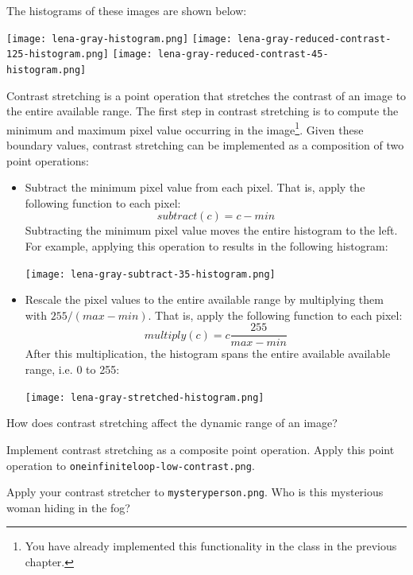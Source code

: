 \documentclass{book}
\begin{document}
The histograms of these images are shown below:
\begin{center}
\texttt{[image: lena-gray-histogram.png]}
\texttt{[image: lena-gray-reduced-contrast-125-histogram.png]}
\texttt{[image: lena-gray-reduced-contrast-45-histogram.png]}
\end{center}

Contrast stretching is a point operation that stretches the contrast of an image to the entire available range. The first step in contrast stretching is to compute the minimum and maximum pixel value occurring in the image\footnote{You have already implemented this functionality in the class  in the previous chapter.}. Given these boundary values, contrast stretching can be implemented as a composition of two point operations:
\begin{itemize}
  \item Subtract the minimum pixel value from each pixel. That is, apply the following function to each pixel:
$$subtract(c) = c - {min}$$
Subtracting the minimum pixel value moves the entire histogram to the left. For example, applying this operation to  results in the following histogram:
\begin{center}
\texttt{[image: lena-gray-subtract-35-histogram.png]}
\end{center}
  \item Rescale the pixel values to the entire available range by multiplying them with $255 / (max - min)$. That is, apply the following function to each pixel:
$$multiply(c) = c \frac{255}{max - min}$$
After this multiplication, the histogram spans the entire available available range, i.e. 0 to 255:
\begin{center}
\texttt{[image: lena-gray-stretched-histogram.png]}
\end{center}
\end{itemize}

\begin{exercise}
How does contrast stretching affect the dynamic range of an image?
\end{exercise}

\begin{exercise}
Implement contrast stretching as a composite point operation. Apply this point operation to \texttt{oneinfiniteloop-low-contrast.png}. 
\end{exercise}

\begin{exercise}
Apply your contrast stretcher to \texttt{mysteryperson.png}. Who is this mysterious woman hiding in the fog?
\end{exercise}
\end{document}
